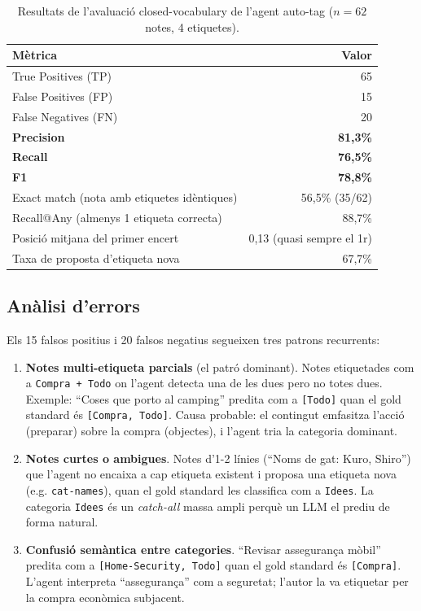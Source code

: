 \begin{table}[htbp]
    \centering
    \caption{Resultats de l'avaluació closed-vocabulary de l'agent auto-tag ($n = 62$ notes, 4 etiquetes).}
    \label{tab:autotag-metrics}
    \begin{tabular}{@{}lr@{}}
        \toprule
        Mètrica & Valor \\
        \midrule
        True Positives (TP) & 65 \\
        False Positives (FP) & 15 \\
        False Negatives (FN) & 20 \\
        \textbf{Precision} & \textbf{81{,}3\%} \\
        \textbf{Recall} & \textbf{76{,}5\%} \\
        \textbf{F1} & \textbf{78{,}8\%} \\
        Exact match (nota amb etiquetes idèntiques) & 56{,}5\% (35/62) \\
        Recall@Any (almenys 1 etiqueta correcta) & 88{,}7\% \\
        Posició mitjana del primer encert & 0{,}13 (quasi sempre el 1r) \\
        Taxa de proposta d'etiqueta nova & 67{,}7\% \\
        \bottomrule
    \end{tabular}
\end{table}

\subsection{Anàlisi d'errors}

Els 15 falsos positius i 20 falsos negatius segueixen tres patrons recurrents:

\begin{enumerate}
    \item \textbf{Notes multi-etiqueta parcials} (el patró dominant). Notes etiquetades com a \texttt{Compra + Todo} on l'agent detecta una de les dues pero no totes dues. Exemple: ``Coses que porto al camping'' predita com a \texttt{[Todo]} quan el gold standard és \texttt{[Compra, Todo]}. Causa probable: el contingut emfasitza l'acció (preparar) sobre la compra (objectes), i l'agent tria la categoria dominant.

    \item \textbf{Notes curtes o ambigues}. Notes d'1-2 línies (``Noms de gat: Kuro, Shiro'') que l'agent no encaixa a cap etiqueta existent i proposa una etiqueta nova (e.g. \texttt{cat-names}), quan el gold standard les classifica com a \texttt{Idees}. La categoria \texttt{Idees} és un \emph{catch-all} massa ampli perquè un LLM el prediu de forma natural.

    \item \textbf{Confusió semàntica entre categories}. ``Revisar assegurança mòbil'' predita com a \texttt{[Home-Security, Todo]} quan el gold standard és \texttt{[Compra]}. L'agent interpreta ``assegurança'' com a seguretat; l'autor la va etiquetar per la compra econòmica subjacent.
\end{enumerate}

